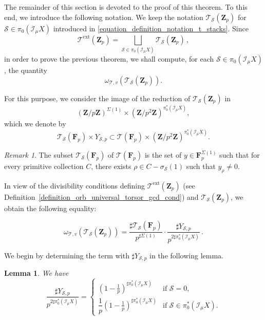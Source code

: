 \documentclass{proc-l}
\newcommand{\Z}{\mathbf{Z}}
\newcommand{\F}{\mathbf{F}}
\DeclareMathOperator{\ext}{ext}
\newcommand{\stackS}{\mathcal{S}}
\newcommand{\stackT}{\mathcal{T}}
\newcommand{\sheafI}{\mathcal{I}}
\newcommand{\w}{\omega}
\newcommand{\sector}{\pi_0(\sheafI_{\mu} X)}
\newcommand{\twistsector}{\pi_0^*(\sheafI_{\mu} X)}
\newtheorem{lemma}[theorem]{Lemma}
\theoremstyle{definition}
\theoremstyle{remark}
\newtheorem{remark}[theorem]{Remark}
\numberwithin{equation}{section}
\begin{document}
The remainder of this section is devoted to the proof of this theorem. To this end, we introduce the following notation. We keep the notation $\stackT_{\stackS}(\Z_p)$ for $\stackS \in \sector$ introduced in \eqref{equation_definition_notation_t_stacks}. Since
\[
\stackT^{\ext}(\Z_p)=\bigsqcup_{\stackS\in\sector}\stackT_{\stackS}(\Z_p) \, ,
\]
in order to prove the previous theorem, we shall compute, for each $\stackS\in\sector$, the quantity
\[
\w_{\stackT,v}(\stackT_{\stackS}(\Z_p)).
\]

For this purpose, we consider the image of the reduction of $\stackT_{\stackS}(\Z_p)$ in
\[
(\Z / p \Z)^{\Sigma(1)} \times (\Z /p^2 \Z)^{\twistsector},
\]
which we denote by
\[
\stackT_{\stackS}(\F_p) \times Y_{\stackS,p}
\subset
\stackT(\F_p) \times (\Z /p^2 \Z)^{\twistsector}.
\]

\begin{remark}\label{remark_description_reduction_stackT_stackS_mod_p}
The subset $\stackT_{\stackS}(\F_p)$ of $\stackT(\F_p)$ is the set of $y \in \F_p^{\Sigma(1)}$ such that for every primitive collection $C$, there exists $\rho \in C - \sigma_\stackS(1)$ such that $ y_{\rho} \neq 0$.
\end{remark}

In view of the divisibility conditions defining $\stackT^{\ext}(\Z_p)$ (see Definition~\ref{definition_orb_universal_torsor_gcd_cond}) and $\stackT_{\stackS}(\Z_p)$, we obtain the following equality:

\begin{equation}\label{equation_computation_mesure_extedended_univ}
    \w_{\stackT,v}(\stackT_{\stackS}(\Z_p))
    =
    \frac{\sharp \stackT_{\stackS}(\F_p)}{p^{\sharp \Sigma(1)}}
    \cdot
    \frac{\sharp Y_{\stackS,p}}{p^{2 \sharp \twistsector}} \, .
\end{equation}

We begin by determining the term with $\sharp Y_{\stackS,p}$ in the following lemma.

\begin{lemma}\label{lemma_computation_cardinal_sector_part}
We have
\[
\frac{\sharp Y_{\stackS,p}}{p^{2 \sharp \twistsector}}
=
\begin{cases}
\left(1-\frac{1}{p}\right)^{\sharp{\twistsector}} & \text{if } \stackS = 0, \\[1em]
\dfrac{1}{p}\left(1-\frac{1}{p}\right)^{\sharp{\twistsector}} & \text{if } \stackS \in \twistsector .
\end{cases}
\]
\end{lemma}
\end{document}
